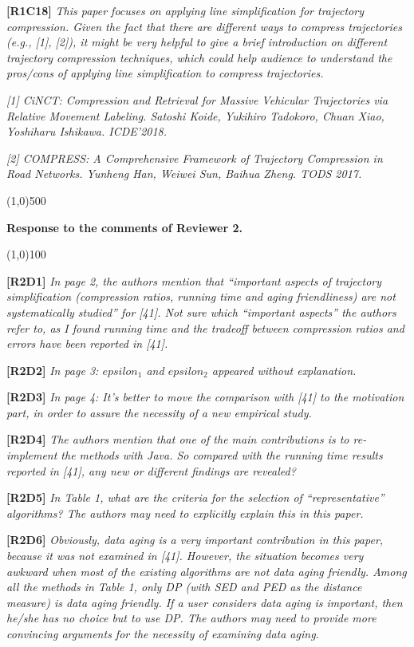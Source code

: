 \documentclass{letter}
\begin{document}
\textbf{[R1C18]} \emph{ This paper focuses on applying line simplification for trajectory compression. Given the fact that there are different ways to compress trajectories (e.g., [1], [2]), it might be very helpful to give a brief introduction on different trajectory compression techniques, which could help audience to understand the pros/cons of applying line simplification to compress trajectories. }

\emph{ [1] CiNCT: Compression and Retrieval for Massive Vehicular Trajectories via Relative Movement Labeling. Satoshi Koide, Yukihiro Tadokoro, Chuan Xiao, Yoshiharu Ishikawa. ICDE'2018.}

\emph{ [2] COMPRESS: A Comprehensive Framework of Trajectory Compression in Road Networks. Yunheng Han, Weiwei Sun, Baihua Zheng. TODS 2017.}


\line(1,0){500}

\textbf{Response to the comments of Reviewer 2.}

\line(1,0){100}

\textbf{[R2D1]} \emph{In page 2, the authors mention that “important aspects of trajectory simplification (compression ratios, running time and aging friendliness) are not systematically studied” for [41]. Not sure which “important aspects” the authors refer to, as I found running time and the tradeoff between compression ratios and errors have been reported in [41].}

\textbf{[R2D2]} \emph{In page 3: $epsilon_1$ and $epsilon_2$ appeared without explanation.}

\textbf{[R2D3]} \emph{ In page 4: It’s better to move the comparison with [41] to the motivation part, in order to assure the necessity of a new empirical study.}

\textbf{[R2D4]} \emph{The authors mention that one of the main contributions is to re-implement the methods with Java. So compared with the running time results reported in [41], any new or different findings are revealed?}

\textbf{[R2D5]} \emph{In Table 1, what are the criteria for the selection of “representative” algorithms? The authors may need to explicitly explain this in this paper.}

\textbf{[R2D6]} \emph{Obviously, data aging is a very important contribution in this paper, because it was not examined in [41]. However, the situation becomes very awkward when most of the existing algorithms are not data aging friendly. Among all the methods in Table 1, only DP (with SED and PED as the distance measure) is data aging friendly. If a user considers data aging is important, then he/she has no choice but to use DP. The authors may need to provide more convincing arguments for the necessity of examining data aging.}
\end{document}
